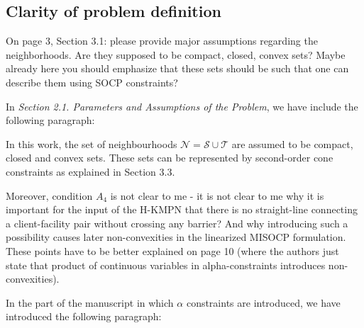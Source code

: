 \documentclass{article}
\newenvironment{reviewer}{\setcounter{pointcounter}{1}}{}
\newcommand{\point}{\text{{\selectfont \thepointcounter} \stepcounter{pointcounter}}}
\begin{document}
\begin{reviewer}
\begin{tcolorbox}[breakable,enhanced,coltitle=black,colback=green!5!white,colframe=green!75!black,title=\textbf{Answer R2.\point},borderline={1pt}{0pt}{black},boxrule=0pt]
		\end{tcolorbox}
		
		\subsection*{Clarity of problem definition}
				
		\begin{itshape}
			On page 3, Section 3.1: please provide major assumptions regarding the neighborhoods. Are they supposed to be compact, closed, convex sets? Maybe already here you should emphasize that these sets should be such that one can describe them using SOCP constraints?
		\end{itshape}
		
		\begin{tcolorbox}[breakable,enhanced,coltitle=black,colback=green!5!white,colframe=green!75!black,title=\textbf{Answer R2.\point},borderline={1pt}{0pt}{black},boxrule=0pt]
			In \textit{Section 2.1. Parameters and Assumptions of the Problem}, we have include the following paragraph: 

			\medskip
			
			In this work, the set of neighbourhoods $\mathcal N=\mathcal S\cup\mathcal T$ are assumed to be compact, closed and convex sets. These sets can be represented by second-order cone constraints as explained in Section 3.3. 
		\end{tcolorbox}
		
		\begin{itshape}
			Moreover, condition $A_4$ is not clear to me - it is not clear to me why it is important for the input of the H-KMPN that there is no straight-line connecting a client-facility pair without crossing any barrier? And why introducing such a possibility causes later non-convexities in the linearized MISOCP formulation. These points have to be better explained on page 10 (where the authors just state that product of continuous variables in alpha-constraints introduces non-convexities).		
		\end{itshape}
	
		\begin{tcolorbox}[breakable,enhanced,coltitle=black,colback=green!5!white,colframe=green!75!black,title=\textbf{Answer R2.\point},borderline={1pt}{0pt}{black},boxrule=0pt]
			In the part of the manuscript in which $\alpha$ constraints are introduced, we have introduced the following paragraph:
			\medskip
			

\end{tcolorbox}
\end{reviewer}
\end{document}
